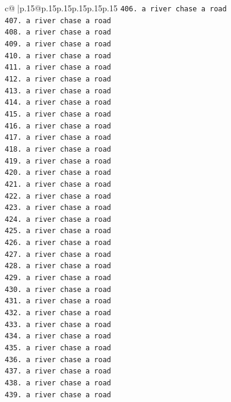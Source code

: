 \documentclass{article}
\begin{document}
{\begin{supertabular}{c@{$\;$}|p{.15\linewidth}@{}p{.15\linewidth}p{.15\linewidth}p{.15\linewidth}p{.15\linewidth}p{.15\linewidth}}
{{{\texttt{406. a river chase a road} \\
\texttt{407. a river chase a road} \\
\texttt{408. a river chase a road} \\
\texttt{409. a river chase a road} \\
\texttt{410. a river chase a road} \\
\texttt{411. a river chase a road} \\
\texttt{412. a river chase a road} \\
\texttt{413. a river chase a road} \\
\texttt{414. a river chase a road} \\
\texttt{415. a river chase a road} \\
\texttt{416. a river chase a road} \\
\texttt{417. a river chase a road} \\
\texttt{418. a river chase a road} \\
\texttt{419. a river chase a road} \\
\texttt{420. a river chase a road} \\
\texttt{421. a river chase a road} \\
\texttt{422. a river chase a road} \\
\texttt{423. a river chase a road} \\
\texttt{424. a river chase a road} \\
\texttt{425. a river chase a road} \\
\texttt{426. a river chase a road} \\
\texttt{427. a river chase a road} \\
\texttt{428. a river chase a road} \\
\texttt{429. a river chase a road} \\
\texttt{430. a river chase a road} \\
\texttt{431. a river chase a road} \\
\texttt{432. a river chase a road} \\
\texttt{433. a river chase a road} \\
\texttt{434. a river chase a road} \\
\texttt{435. a river chase a road} \\
\texttt{436. a river chase a road} \\
\texttt{437. a river chase a road} \\
\texttt{438. a river chase a road} \\
\texttt{439. a river chase a road} \\
}}}
\end{supertabular}}
\end{document}
